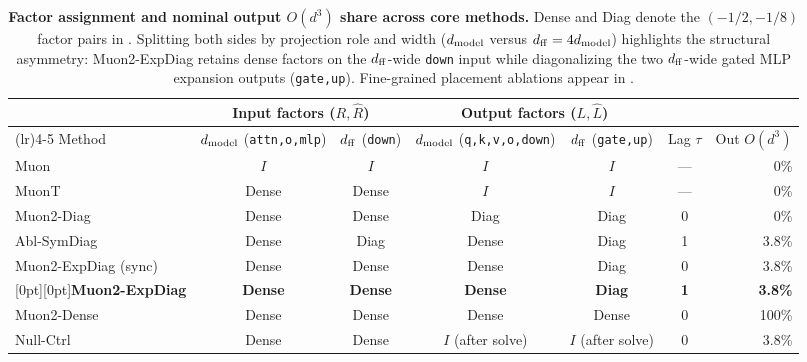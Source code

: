 \begin{table}[!htb]\centering\small
\setlength{\tabcolsep}{4.0pt}
\caption{\textbf{Factor assignment and nominal output $O(d^3)$ share across core methods.} Dense and Diag denote the $(-1/2,-1/8)$ factor pairs in . Splitting both sides by projection role and width ($d_{\mathrm{model}}$ versus $d_{\mathrm{ff}}=4d_{\mathrm{model}}$) highlights the structural asymmetry: Muon2-ExpDiag retains dense factors on the $d_{\mathrm{ff}}$-wide \texttt{down} input while diagonalizing the two $d_{\mathrm{ff}}$-wide gated MLP expansion outputs (\texttt{gate,up}). Fine-grained placement ablations appear in .}\label{tab:taxonomy}
\begin{tabularx}{\textwidth}{@{}>{\raggedright\arraybackslash}Xcccccr@{}}
\toprule
& \multicolumn{2}{c}{Input factors ($R,\hat R$)} & \multicolumn{2}{c}{Output factors ($L,\hat L$)} & & \\
\cmidrule(lr){2-3}\cmidrule(lr){4-5}
Method & $d_{\mathrm{model}}$ (\texttt{attn,o,mlp}) & $d_{\mathrm{ff}}$ (\texttt{down}) & $d_{\mathrm{model}}$ (\texttt{q,k,v,o,down}) & $d_{\mathrm{ff}}$ (\texttt{gate,up}) & Lag $\tau$ & Out $O(d^3)$ \\
\midrule
Muon & $I$ & $I$ & $I$ & $I$ & --- & 0\% \\
MuonT & Dense & Dense & $I$ & $I$ & --- & 0\% \\
Muon2-Diag & Dense & Dense & Diag & Diag & 0 & 0\% \\
Abl-SymDiag & Dense & Diag & Dense & Diag & 1 & 3.8\% \\
Muon2-ExpDiag (sync) & Dense & Dense & Dense & Diag & 0 & 3.8\% \\
\rowcolor{rowtint}[0pt][0pt]\textbf{Muon2-ExpDiag} & \textbf{Dense} & \textbf{Dense} & \textbf{Dense} & \textbf{Diag} & \textbf{1} & \textbf{3.8\%} \\
Muon2-Dense & Dense & Dense & Dense & Dense & 0 & 100\% \\
Null-Ctrl & Dense & Dense & $I$ (after solve) & $I$ (after solve) & 0 & 3.8\% \\
\bottomrule\end{tabularx}
\end{table}
